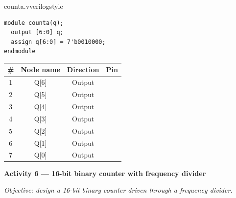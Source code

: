 \begin{procedure}
  \begin{codepanel}{counta.v}{verilogstyle}
    \begin{lstlisting}
module counta(q);
  output [6:0] q;
  assign q[6:0] = 7'b0010000;
endmodule
\end{lstlisting}
  \end{codepanel}
  \vspace{-4pt}

  \needspace{4cm}
  \begin{boxedtable}
    \label{tab:exp3-pins}
    {\renewcommand{\arraystretch}{1.5}
      \centering
      \begin{tabular}{cccc}
        \toprule
        \# & Node name & Direction & Pin \\
        \midrule
        1  & Q[6]      & Output    &     \\
        2  & Q[5]      & Output    &     \\
        3  & Q[4]      & Output    &     \\
        4  & Q[3]      & Output    &     \\
        5  & Q[2]      & Output    &     \\
        6  & Q[1]      & Output    &     \\
        7  & Q[0]      & Output    &     \\
        \bottomrule
      \end{tabular}
    }
  \end{boxedtable}
  \vspace*{1.5em}

  \textbf{Activity 6 --- 16-bit binary counter with frequency divider}\vspace{2pt}

  \textit{Objective: design a 16-bit binary counter driven through a frequency divider.}


\end{procedure}
